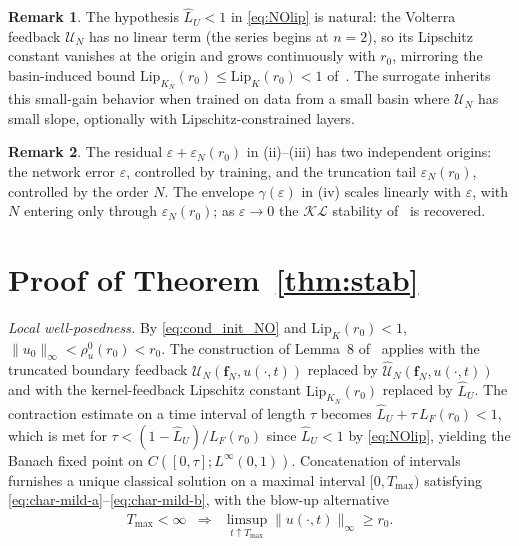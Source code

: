 \documentclass[twocolumn,amsthm]{autart}
\newcommand{\Linf}{L^\infty}
\newcommand{\Lip}{\mathrm{Lip}}
\newcommand{\Lipk}{\mathrm{Lip}_K}
\newcommand{\eps}{\varepsilon}
\theoremstyle{plain}
\theoremstyle{definition}
\newtheorem{remark}{Remark}
\begin{document}
\begin{remark}
\label{rem:small-gain}
The hypothesis $\hat L_U < 1$ in \eqref{eq:NOlip} is natural: the Volterra feedback $\mathcal{U}_N$ has no linear term (the series begins at $n=2$), so its Lipschitz constant vanishes at the origin and grows continuously with $r_0$, mirroring the basin-induced bound $\Lip_{K_N}(r_0) \le \Lip_K(r_0) < 1$ of~\cite{krstic2026feedbacklinearizationhyperbolicpdes-trunc}. The surrogate inherits this small-gain behavior when trained on data from a small basin where $\mathcal{U}_N$ has small slope, optionally with Lipschitz-constrained layers.
\end{remark}

\begin{remark}
\label{rmk:residual-eps-N}
The residual $\eps + \eps_N(r_0)$ in (ii)--(iii) has two independent origins: the network error $\eps$, controlled by training, and the truncation tail $\eps_N(r_0)$, controlled by the order $N$. The envelope $\gamma(\eps)$ in (iv) scales linearly with $\eps$, with $N$ entering only through $\eps_N(r_0)$; as $\eps \to 0$ the $\mathcal{KL}$ stability of~\cite{krstic2026feedbacklinearizationhyperbolicpdes-trunc} is recovered.
\end{remark}

\section{Proof of Theorem~\ref{thm:stab}}
\label{sec:proof-stab}

\emph{Local well-posedness.} By \eqref{eq:cond_init_NO} and $\Lipk(r_0)<1$, $\|u_0\|_\infty < \rho_u^0(r_0) < r_0$. The construction of Lemma~8 of~\cite{krstic2026feedbacklinearizationhyperbolicpdes-trunc} applies with the truncated boundary feedback $\mathcal{U}_N(\mathbf{f}_N, u(\cdot,t))$ replaced by $\widehat{\mathcal{U}}_N(\mathbf{f}_N, u(\cdot,t))$ and with the kernel-feedback Lipschitz constant $\Lip_{K_N}(r_0)$ replaced by $\hat L_U$. The contraction estimate on a time interval of length $\tau$ becomes $\hat L_U + \tau\, L_F(r_0) < 1$, which is met for $\tau < (1 - \hat L_U)/L_F(r_0)$ since $\hat L_U < 1$ by \eqref{eq:NOlip}, yielding the Banach fixed point on $C([0, \tau]; \Linf(0,1))$. Concatenation of intervals furnishes a unique classical solution on a maximal interval $[0, T_{\max})$ satisfying \eqref{eq:char-mild-a}--\eqref{eq:char-mild-b}, with the blow-up alternative
\begin{eqnarray}
T_{\max} < \infty &\Rightarrow& \limsup_{t \uparrow T_{\max}}\|u(\cdot,t)\|_\infty \ge r_0.
\label{eq:blowup-alt}
\end{eqnarray}
\end{document}
